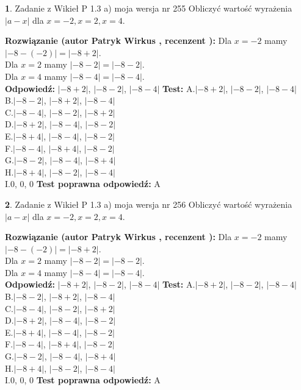 \documentclass[12pt, a4paper]{article}
\theoremstyle{definition} %
\newtheorem{zad}{}
\newcommand{\zadStart}[1]{\begin{zad}#1\newline}
\newcommand{\zadStop}{\end{zad}}
\newcommand{\rozwStart}[2]{\noindent \textbf{Rozwiązanie (autor #1 , recenzent #2): }\newline}
\newcommand{\rozwStop}{\newline}
\newcommand{\odpStart}{\noindent \textbf{Odpowiedź:}\newline}
\newcommand{\odpStop}{\newline}
\newcommand{\testStart}{\noindent \textbf{Test:}\newline}
\newcommand{\testStop}{\newline}
\newcommand{\kluczStart}{\noindent \textbf{Test poprawna odpowiedź:}\newline}
\newcommand{\kluczStop}{\newline}
\begin{document}
\zadStart{Zadanie z Wikieł P 1.3 a) moja wersja nr 255}
Obliczyć wartość wyrażenia $|a - x|$ dla $x=-2,x=2,x=4$.
\zadStop
\rozwStart{Patryk Wirkus}{}
Dla $x = -2$ mamy $|-8 - (-2)| = |-8 + 2|$.\\
Dla $x = 2$ mamy $|-8 - 2| = |-8 - 2|$.\\
Dla $x = 4$ mamy $|-8 - 4| = |-8 - 4|$.\\
\rozwStop
\odpStart
$|-8 + 2|$, $|-8 - 2|$, $|-8 - 4|$
\odpStop
\testStart
A.$|-8 + 2|$, $|-8 - 2|$, $|-8 - 4|$\\
B.$|-8 - 2|$, $|-8 + 2|$, $|-8 - 4|$\\
C.$|-8 - 4|$, $|-8 - 2|$, $|-8 + 2|$\\
D.$|-8 + 2|$, $|-8 - 4|$, $|-8 - 2|$\\
E.$|-8 + 4|$, $|-8 - 4|$, $|-8 - 2|$\\
F.$|-8 - 4|$, $|-8 + 4|$, $|-8 - 2|$\\
G.$|-8 - 2|$, $|-8 - 4|$, $|-8 + 4|$\\
H.$|-8 + 4|$, $|-8 - 2|$, $|-8 - 4|$\\
I.$0$, $0$, $0$
\testStop
\kluczStart
A
\kluczStop



\zadStart{Zadanie z Wikieł P 1.3 a) moja wersja nr 256}
Obliczyć wartość wyrażenia $|a - x|$ dla $x=-2,x=2,x=4$.
\zadStop
\rozwStart{Patryk Wirkus}{}
Dla $x = -2$ mamy $|-8 - (-2)| = |-8 + 2|$.\\
Dla $x = 2$ mamy $|-8 - 2| = |-8 - 2|$.\\
Dla $x = 4$ mamy $|-8 - 4| = |-8 - 4|$.\\
\rozwStop
\odpStart
$|-8 + 2|$, $|-8 - 2|$, $|-8 - 4|$
\odpStop
\testStart
A.$|-8 + 2|$, $|-8 - 2|$, $|-8 - 4|$\\
B.$|-8 - 2|$, $|-8 + 2|$, $|-8 - 4|$\\
C.$|-8 - 4|$, $|-8 - 2|$, $|-8 + 2|$\\
D.$|-8 + 2|$, $|-8 - 4|$, $|-8 - 2|$\\
E.$|-8 + 4|$, $|-8 - 4|$, $|-8 - 2|$\\
F.$|-8 - 4|$, $|-8 + 4|$, $|-8 - 2|$\\
G.$|-8 - 2|$, $|-8 - 4|$, $|-8 + 4|$\\
H.$|-8 + 4|$, $|-8 - 2|$, $|-8 - 4|$\\
I.$0$, $0$, $0$
\testStop
\kluczStart
A
\kluczStop
\end{document}
